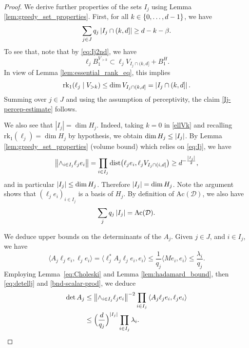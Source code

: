 \begin{proof}
We derive further properties of the sets $I_{j}$ using Lemma \ref{lem:greedy_set_properties}. First, for all $k\in \left\{ 0, \dotsc, d - 1 \right\}$, we have
\begin{equation}\label{Ij-percep-estimate}
\sum_{j\in J} q_{j} \left\lvert I_j \cap (k, d] \right\rvert  \geq d - k - \beta.
\end{equation}
To see that, note that by \eqref{eq:Ij2nd}, we have
\begin{equation*}%
\ell_j B_{1}^{V_{> k}} \subset \ell_j V_{I_j \cap (k,d]} + B^H_{1}.
\end{equation*}
In view of Lemma \ref{lem:essential_rank_eq}, this implies
\begin{equation}\label{ellVk}
\mathrm{rk}_1(\ell_j \mid V_{> k}) \leq \dim V_{I_j \cap (k, d]} = \left\lvert I_j \cap (k, d]\right\rvert.
\end{equation}
Summing over $j \in J$ and using the assumption of perceptivity, the claim \eqref{Ij-percep-estimate} follows.


We also see that $|I_{j}|=\dim H_{j}$. Indeed, taking $k=0$ in \eqref{ellVk} and recalling $\mathrm{rk}_{1}(\ell_j) = \dim H_j$ by hypothesis, we obtain $\dim H_j \leq \left\lvert I_j\right\rvert$.
By Lemma \ref{lem:greedy_set_properties} (volume bound) which relies on \eqref{eq:Ij}, we have
\begin{equation}\label{eq:detellj}
\left\lVert \wedge_{i\in I_{j}}\ell_{j}e_{i}  \right\rVert = \prod_{i \in I_j} \mathrm{dist}\bigl(\ell_j e_i, \ell_j V_{I_j \cap (i,d]}\bigr) \geq d^{-\frac{\left\lvert I_j\right\rvert}{2}},
\end{equation}
and in particular $\left\lvert I_j\right\rvert \leq \dim H_j$.
Therefore $\left\lvert I_j\right\rvert=\dim H_{j}$. Note the argument shows that $(\ell_{j}e_{i})_{i\in I_{j}}$ is a basis of $H_{j}$. By definition of $\mathrm{Ac}(\mathcal{D})$, we also have
\begin{equation}\label{Ij-cardinal}
\sum_{j}q_{j} \left\lvert I_{j}\right\rvert = \mathrm{Ac}(\mathcal{D}).
\end{equation}


We deduce upper bounds on the determinants of the $A_{j}$.
Given $j \in J$, and $i\in I_j$, we have
\begin{equation}\label{bnd-scalar-prod}
{\langle A_{j}\ell_{j}e_{i},  \ell_{j} e_{i}\rangle} = {\langle \ell_{j}^*A_{j}\ell_{j}e_{i}, e_{i}\rangle} \leq \frac{1}{q_j} {\langle M e_{i}, e_{i}\rangle} \leq \frac{\lambda_i}{q_j}.
\end{equation}
Employing Lemma~\ref{eq:Choleski} and Lemma \ref{lem:hadamard_bound}, then \eqref{eq:detellj} and \eqref{bnd-scalar-prod}, we deduce
\begin{align*}
{\det A_{j}} & \leq \left\lVert \wedge_{i\in I_{j}}\ell_{j}e_{i}  \right\rVert^{-2} \prod_{i\in I_{j}}{\langle A_{j}\ell_{j}e_{i},  \ell_{j} e_{i}\rangle}\\
&\leq \Bigl(\frac{d}{q_j}\Bigr)^{\left\lvert I_j\right\rvert} \prod_{i\in I_{j}}\lambda_{i}.
\end{align*}


\end{proof}
